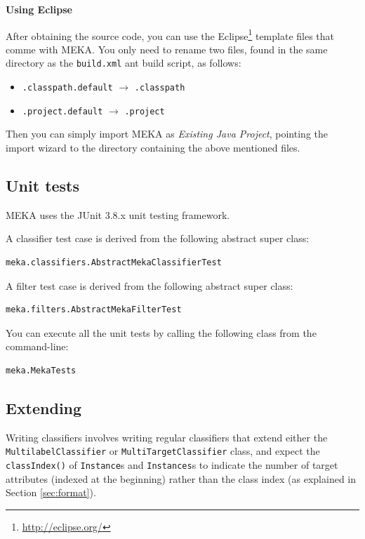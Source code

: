 \documentclass[11pt]{article}
\newcommand{\MEKA}{Meka}
\newcommand{\WEKA}{Weka}
\newcommand{\heading}[1]{
    \vspace{0.3cm} \noindent \textbf{#1} \newline
}
\begin{document}
\heading{Using Eclipse}
After obtaining the source code, you can use the Eclipse\footnote{\url{http://eclipse.org/}} template files that comme with MEKA. You only need to rename two files, found in the same directory as the \texttt{build.xml} ant build script, as follows:
\begin{itemize}
  \item \texttt{.classpath.default} $\rightarrow$ \texttt{.classpath}
  \item \texttt{.project.default} $\rightarrow$ \texttt{.project}
\end{itemize}
Then you can simply import MEKA as \textit{Existing Java Project}, pointing the import wizard to the directory containing the above mentioned files.

\subsection{Unit tests}
\label{unittests}
MEKA uses the JUnit 3.8.x unit testing framework.

\noindent A classifier test case is derived from the following abstract super class:
\begin{lstlisting}
meka.classifiers.AbstractMekaClassifierTest
\end{lstlisting}

\noindent A filter test case is derived from the following abstract super class:
\begin{lstlisting}
meka.filters.AbstractMekaFilterTest
\end{lstlisting}

\noindent You can execute all the unit tests by calling the following class from the command-line:
\begin{lstlisting}
meka.MekaTests
\end{lstlisting}

\subsection{\label{sec:extending}Extending \framework{\MEKA}}%

Writing \framework{\MEKA} classifiers involves writing regular \framework{\WEKA} classifiers that extend either the \texttt{MultilabelClassifier} or \texttt{MultiTargetClassifier} class, and expect the \texttt{classIndex()} of \texttt{Instance}s and \texttt{Instances}s to indicate the number of target attributes (indexed at the beginning) rather than the class index (as explained in Section \ref{sec:format}). 
\end{document}
